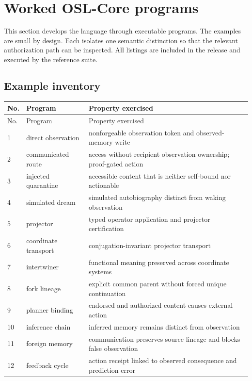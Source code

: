\section{Worked OSL-Core programs}
\label{sec:osl-examples}

This section develops the language through executable programs.  The examples
are small by design.  Each isolates one semantic distinction so that the
relevant authorization path can be inspected.  All listings are included in the
release and executed by the reference suite.

\subsection{Example inventory}

\begin{longtable}{p{}p{}p{}}
\toprule
No. & Program & Property exercised \\
\midrule
\endfirsthead
\toprule
No. & Program & Property exercised \\
\midrule
\endhead
1 & direct observation & nonforgeable observation token and observed-memory write \\
2 & communicated route & access without recipient observation ownership; proof-gated action \\
3 & injected quarantine & accessible content that is neither self-bound nor actionable \\
4 & simulated dream & simulated autobiography distinct from waking observation \\
5 & projector & typed operator application and projector certification \\
6 & coordinate transport & conjugation-invariant projector transport \\
7 & intertwiner & functional meaning preserved across coordinate systems \\
8 & fork lineage & explicit common parent without forced unique continuation \\
9 & planner binding & endorsed and authorized content causes external action \\
10 & inference chain & inferred memory remains distinct from observation \\
11 & foreign memory & communication preserves source lineage and blocks false observation \\
12 & feedback cycle & action receipt linked to observed consequence and prediction error \\

\end{longtable}
